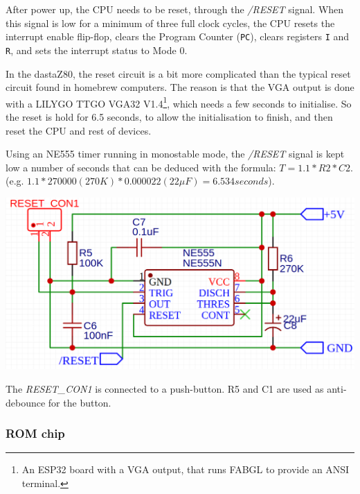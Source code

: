 \documentclass[a4paper,11pt]{article}
\begin{document}
    After power up, the CPU needs to be reset, through the \textit{/RESET}
    signal. When this signal is low for a minimum of three full clock cycles,
    the CPU resets the interrupt enable flip-flop, clears the Program Counter
    (\texttt{PC}), clears registers \texttt{I} and \texttt{R}, and sets the
    interrupt status to Mode 0. 

    In the dastaZ80, the reset circuit is a bit more complicated than the 
    typical reset circuit found in homebrew computers. The reason is that the
    VGA output is done with a LILYGO TTGO  VGA32 V1.4\footnote{An ESP32 board
    with a VGA output, that runs FABGL to provide an ANSI terminal.}, which
    needs a few seconds to initialise. So the reset is hold for 6.5 seconds, to
    allow the initialisation to finish,  and then reset the CPU and rest of
    devices.

    Using an NE555 timer running in monostable mode, the \textit{/RESET} signal
    is kept low a number of seconds that can be deduced with the formula: 
    $T = 1.1 * R2 * C2$. (e.g. $1.1 * 270000 (270K) * 0.000022 (22\mu F) = 
    6.534 seconds$).

    \begin{center}
        \includegraphics[scale=0.3]{images/dastaz80resetcircuit.png}
    \end{center}

    The \textit{RESET\_CON1} is connected to a push-button. R5 and C1 are used as 
    anti-debounce for the button.

    \subsubsection{ROM chip}
\end{document}
